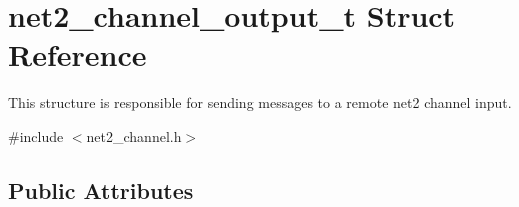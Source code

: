 \hypertarget{structnet2__channel__output__t}{}\section{net2\+\_\+channel\+\_\+output\+\_\+t Struct Reference}
\label{structnet2__channel__output__t}


This structure is responsible for sending messages to a remote net2 channel input.  




{\ttfamily \#include $<$net2\+\_\+channel.\+h$>$}

\subsection*{Public Attributes}
